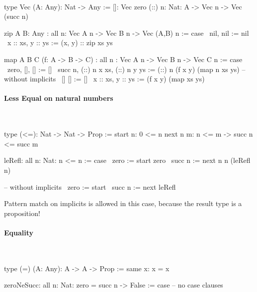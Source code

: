 \ \begin{alba}
    type Vec (A: Any): Nat -> Any :=
        []:  Vec zero
        (::) {n: Nat}: A -> Vec n -> Vec (succ n)

    zip {A B: Any}
    : all {n}: Vec A n -> Vec B n -> Vec (A,B) n
    := case
        \ nil,     nil     := nil
        \ x :: xs, y :: ys := (x, y) :: zip xs ys
\end{alba}

\begin{alba}
    map {A B C} (f: A -> B -> C)
        : all {n}
          : Vec A n -> Vec B n -> Vec C n
    := case
        \ {zero},   [],            [] :=
            []
        \ {succ n}, (::) {n} x xs, (::) {n} y ys :=
            (::) {n} (f x y) (map {n} xs ys)
        -- without implicits
        \ [] []            := []
        \ x :: xs, y :: ys := (f x y) (map xs ys)
\end{alba}





\paragraph{Less Equal on natural numbers}


\ \begin{alba}
    type (<=): Nat -> Nat -> Prop :=
        start {n}:    0 <= n
        next  {n m}:  n <= m -> succ n <= succ m

    leRefl: all {n: Nat}: n <= n := case
        \ {zero}   := start {zero}
        \ {succ n} := next {n} {n} (leRefl {n})

        -- without implicits
        \ {zero}   := start
        \ {succ n} := next leRefl
\end{alba}

Pattern match on implicits is allowed in this case, because the result type is a
proposition!




\paragraph{Equality}

\ \begin{alba}
    type (=) (A: Any): A -> A -> Prop :=
        same {x}: x = x

    zeroNeSucc: all {n: Nat}: zero = succ n -> False :=
        case
            -- no case clauses
\end{alba}

